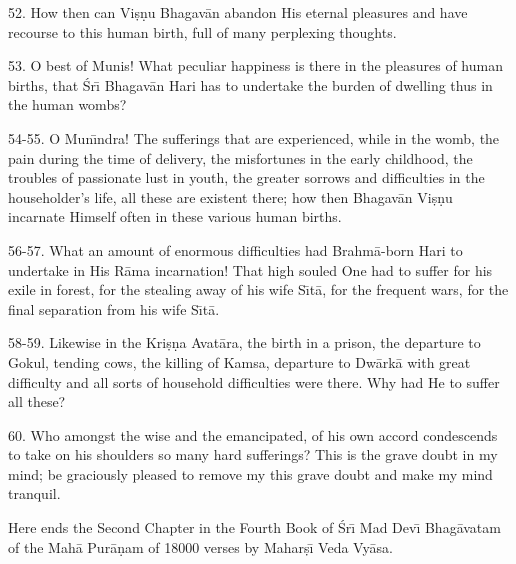 52. How then can Vi\d{s}\d{n}u Bhagav\=an abandon His eternal pleasures and have recourse to this human birth, full of many perplexing thoughts.

53. O best of Munis! What peculiar happiness is there in the pleasures of human births, that \'Sr\={\i} Bhagav\=an Hari has to undertake the burden of dwelling thus in the human wombs?

54-55. O Mun\={\i}ndra! The sufferings that are experienced, while in the womb, the pain during the time of delivery, the misfortunes in the early childhood, the troubles of passionate lust in youth, the greater sorrows and difficulties in the householder's life, all these are existent there; how then Bhagav\=an Vi\d{s}\d{n}u incarnate Himself often in these various human births.

56-57. What an amount of enormous difficulties had Brahm\=a-born Hari to undertake in His R\=ama incarnation! That high souled One had to suffer for his exile in forest, for the stealing away of his wife S\={\i}t\=a, for the frequent wars, for the final separation from his wife S\={\i}t\=a.

58-59. Likewise in the Kri\d{s}\d{n}a Avat\=ara, the birth in a prison, the departure to Gokul, tending cows, the killing of Kamsa, departure to Dw\=ark\=a with great difficulty and all sorts of household difficulties were there. Why had He to suffer all these?

60. Who amongst the wise and the emancipated, of his own accord condescends to take on his shoulders so many hard sufferings? This is the grave doubt in my mind; be graciously pleased to remove my this grave doubt and make my mind tranquil.

Here ends the Second Chapter in the Fourth Book of \'Sr\={\i} Mad Dev\={\i} Bhag\=avatam of the Mah\=a Pur\=a\d{n}am of 18000 verses by Mahar\d{s}\={\i} Veda Vy\=asa.




